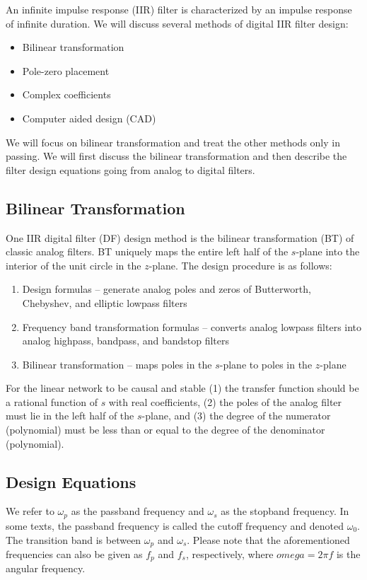 \documentclass[11pt]{book}
\theoremstyle{example}
\begin{document}
An infinite impulse response (IIR) filter is characterized by an impulse response of infinite duration. We will discuss several methods of digital IIR filter design:
\begin{itemize}
	\item Bilinear transformation
	\item Pole-zero placement
	\item Complex coefficients
	\item Computer aided design (CAD)
\end{itemize}

We will focus on bilinear transformation and treat the other methods only in passing. We will first discuss the bilinear transformation and then describe the filter design equations going from analog to digital filters.

\subsection{Bilinear Transformation}

One IIR digital filter (DF) design method is the bilinear transformation (BT) of classic analog filters. BT uniquely maps the entire left half of the $s$-plane into the interior of the unit circle in the $z$-plane. The design procedure is as follows:
\begin{enumerate}
	\item Design formulas -- generate analog poles and zeros of Butterworth, Chebyshev, and elliptic lowpass filters
	\item Frequency band transformation formulas -- converts analog lowpass filters into analog highpass, bandpass, and bandstop filters
	\item Bilinear transformation -- maps poles in the $s$-plane to poles in the $z$-plane
\end{enumerate}

For the linear network to be causal and stable (1) the transfer function should be a rational function of $s$ with real coefficients, (2) the poles of the analog filter must lie in the left half of the $s$-plane, and (3) the degree of the numerator (polynomial) must be less than or equal to the degree of the denominator (polynomial).

\subsection{Design Equations}

We refer to $\omega_p$ as the passband frequency and $\omega_s$ as the stopband frequency. In some texts, the passband frequency is called the cutoff frequency and denoted $\omega_0$. The transition band is between $\omega_p$ and $\omega_s$. Please note that the aforementioned frequencies can also be given as $f_p$ and $f_s$, respectively, where $omega=2{\pi}f$ is the angular frequency. 
\end{document}

